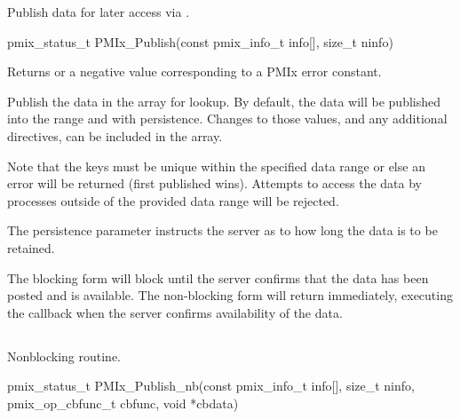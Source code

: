 \summary

Publish data for later access via .

\format

\cspecificstart
\begin{codepar}
pmix_status_t
PMIx_Publish(const pmix_info_t info[], size_t ninfo)
\end{codepar}
\cspecificend

\begin{arglist}
\end{arglist}

Returns  or a negative value corresponding to a PMIx error constant.

\descr

Publish the data in the  array for lookup.
By default, the data will be published into the  range and with  persistence.
Changes to those values, and any additional directives, can be included in the  array.

Note that the keys must be unique within the specified data range or else an error will be returned (first published wins).
Attempts to access the data by processes outside of the provided data range will be rejected.

The persistence parameter instructs the server as to how long the data is to be retained.

The blocking form will block until the server confirms that the data has been posted and is available.
The non-blocking form will return immediately, executing the callback when the server confirms availability of the data.


\subsection{}

\summary

Nonblocking  routine.

\format

\cspecificstart
\begin{codepar}
pmix_status_t 
PMIx_Publish_nb(const pmix_info_t info[], size_t ninfo,
                pmix_op_cbfunc_t cbfunc, void *cbdata)
\end{codepar}
\cspecificend

